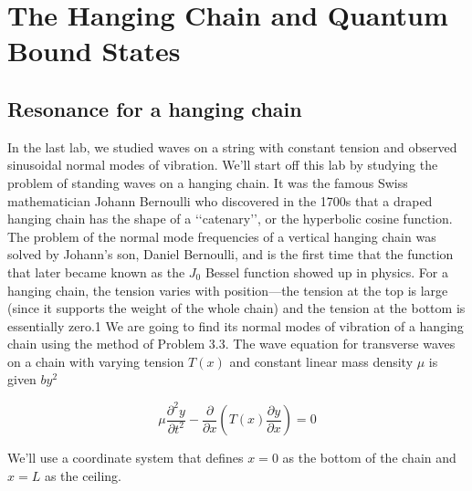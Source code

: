 
\chapter*{The Hanging Chain and Quantum Bound States}
\section*{Resonance for a hanging chain}

In the last lab, we studied waves on a string with constant tension and observed
sinusoidal normal modes of vibration. We\rq ll start off this lab by studying the
problem of standing waves on a hanging chain. It was the famous Swiss mathematician Johann Bernoulli who discovered in the 1700s that a draped hanging
chain has the shape of a \lq\lq catenary\rq\rq, or the hyperbolic cosine function. The problem of the normal mode frequencies of a vertical hanging chain was solved by
Johann\rq s son, Daniel Bernoulli, and is the first time that the function that later
became known as the $J_0$ Bessel function showed up in physics.
For a hanging chain, the tension varies with position—the tension at the top
is large (since it supports the weight of the whole chain) and the tension at the
bottom is essentially zero.1 We are going to find its normal modes of vibration of a
hanging chain using the method of Problem 3.3. The wave equation for transverse
waves on a chain with varying tension $T (x)$ and constant linear mass density $\mu$ is
given $by^2$

\begin{equation}\label{eq:41}
		\mu \frac{\partial^2 y}{\partial t^2} - \frac{\partial}{\partial x}(T(x)\frac{\partial y}{\partial x}) = 0
				\end{equation}
				
		We\rq ll use a coordinate system that defines $x = 0$ as the bottom of the chain and
$x = L$ as the ceiling.		


